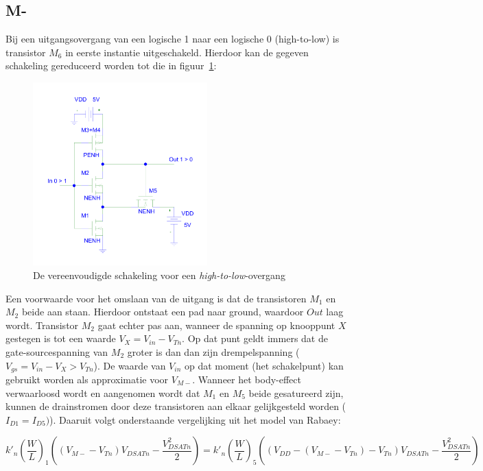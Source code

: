 \documentclass{scrartcl}  %
\begin{document}
\subsection{M-}
\label{subsec:trig-methode-mminus}
Bij een uitgangsovergang van een logische 1 naar een logische 0 (high-to-low) is transistor $M_{6}$ in eerste instantie uitgeschakeld. Hierdoor kan de gegeven schakeling gereduceerd worden tot die in figuur~\ref{fig:schmitt-schem-high-to-low}:

\begin{figure}[H]
\centering
	\includegraphics[width=0.6\textwidth]{resource/schmitt-high-to-low-rc.pdf}
	\caption{De vereenvoudigde schakeling voor een \textit{high-to-low}-overgang}
	\label{fig:schmitt-schem-high-to-low}
\end{figure}

Een voorwaarde voor het omslaan van de uitgang is dat de transistoren $M_{1}$ en $M_{2}$ beide aan staan.
Hierdoor ontstaat een pad naar ground, waardoor $Out$ laag wordt.
Transistor $M_{2}$ gaat echter pas aan, wanneer de spanning op knooppunt $X$ gestegen is tot een waarde $V_{X} = V_{in} - V_{Tn}$.
Op dat punt geldt immers dat de gate-sourcespanning van $M_{2}$ groter is dan dan zijn drempelspanning ($V_{gs} = V_{in} - V_{X} > V_{Tn}$). 
De waarde van $V_{in}$ op dat moment (het schakelpunt) kan gebruikt worden als approximatie voor $V_{M-}$. 
Wanneer het body-effect verwaarloosd wordt en aangenomen wordt dat $M_{1}$ en $M_{5}$ beide gesatureerd zijn, kunnen de drainstromen door deze transistoren aan elkaar gelijkgesteld worden ($I_{D1} = I_{D5})$). 
Daaruit volgt onderstaande vergelijking uit het model van Rabaey:

$$k'_{n}(\frac{W}{L})_{1}((V_{M-}-V_{Tn})V_{DSATn} - \frac{V^{2}_{DSATn}}{2}) = k'_{n}(\frac{W}{L})_{5}((V_{DD}-(V_{M-}-V_{Tn})-V_{Tn})V_{DSATn} - \frac{V^{2}_{DSATn}}{2})$$
\end{document}
